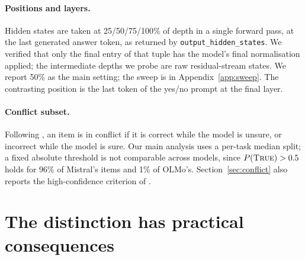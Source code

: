 \documentclass[10pt]{article}
\newcommand{\ptrue}{P(\textsc{True})}
\begin{document}
\paragraph{Positions and layers.} Hidden states are taken at 25/50/75/100\% of depth in a single
forward pass, at the last generated answer token, as returned by
\texttt{output\_\allowbreak hidden\_\allowbreak states}. We verified that only the final entry
of that tuple has the model's final normalisation applied; the intermediate depths we probe are raw
residual-stream states. We report 50\% as the main setting;
the sweep is in Appendix~\ref{app:sweep}. The contrasting position is the last token of the yes/no
prompt at the final layer.

\paragraph{Conflict subset.} Following \citet{diagnosing2026}, an item is in conflict if it is
correct while the model is unsure, or incorrect while the model is sure. Our main analysis uses a
per-task median split; a fixed absolute threshold is not comparable across models, since
$\ptrue{} > 0.5$ holds for 96\% of Mistral's items and 1\% of OLMo's. Section~\ref{sec:conflict}
also reports the high-confidence criterion of \citet{diagnosing2026}.

\section{The distinction has practical consequences}
\label{sec:f1}
\end{document}
